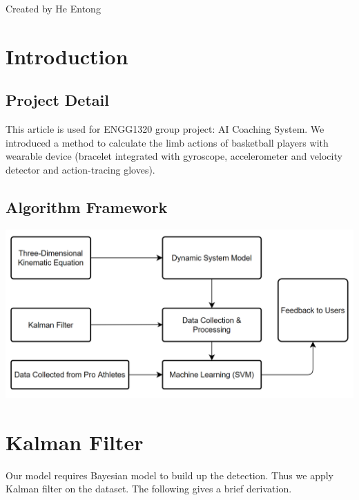 \documentclass[12pt]{article}
\begin{document}
\noindent
    Created by He Entong
    \tableofcontents
    \newpage
    \section{Introduction}
    \subsection{Project Detail}
    This article is used for ENGG1320 group project: AI Coaching System. We introduced a method to calculate the limb actions of basketball players with wearable device (bracelet integrated with gyroscope, accelerometer and velocity detector and action-tracing gloves). 
    \subsection{Algorithm Framework}
    \begin{center}
    \includegraphics[width = \linewidth]{Algorithm Framework.png}
    \end{center}
    \section{Kalman Filter}
    Our model requires Bayesian model to build up the detection. Thus we apply Kalman filter on the dataset. The following gives a brief derivation.
\end{document}
